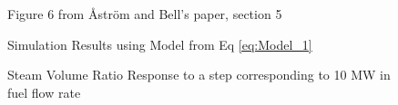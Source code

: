         \begin{figure}[ht]
            \begin{center}
                    
                Figure 6 from \r{A}str\"{o}m and Bell's paper, section 5 \cite{Astrom}
                
                
                Simulation Results using Model from Eq \eqref{eq:Model_1}
                
                \caption{Steam Volume Ratio Response to a step corresponding to 10 MW in fuel flow rate}
                \label{fig:Fig6E}
            \end{center}
        \end{figure}  %
